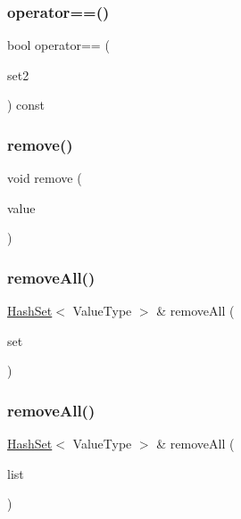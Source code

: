 \subsubsection{\texorpdfstring{operator==()}{operator==()}}
{\footnotesize\ttfamily bool operator== (\begin{DoxyParamCaption}\item[{const \mbox{\hyperlink{classHashSet}{Hash\+Set}}$<$ Value\+Type $>$ \&}]{set2 }\end{DoxyParamCaption}) const}

\mbox{\label{classHashSet_ab8213d15b557acafdd461c231e9ade3b}} 
\subsubsection{\texorpdfstring{remove()}{remove()}}
{\footnotesize\ttfamily void remove (\begin{DoxyParamCaption}\item[{const Value\+Type \&}]{value }\end{DoxyParamCaption})}

\mbox{\label{classHashSet_a43bfd4637e7359634f7b3b57ca6379a3}} 
\subsubsection{\texorpdfstring{remove\+All()}{removeAll()}\hspace{0.1cm}{\footnotesize\ttfamily [1/2]}}
{\footnotesize\ttfamily \mbox{\hyperlink{classHashSet}{Hash\+Set}}$<$ Value\+Type $>$ \& remove\+All (\begin{DoxyParamCaption}\item[{const \mbox{\hyperlink{classHashSet}{Hash\+Set}}$<$ Value\+Type $>$ \&}]{set }\end{DoxyParamCaption})}

\mbox{\label{classHashSet_ae4e6fba96cbdc7cc417dea499fa89e91}} 
\subsubsection{\texorpdfstring{remove\+All()}{removeAll()}\hspace{0.1cm}{\footnotesize\ttfamily [2/2]}}
{\footnotesize\ttfamily \mbox{\hyperlink{classHashSet}{Hash\+Set}}$<$ Value\+Type $>$ \& remove\+All (\begin{DoxyParamCaption}\item[{std\+::initializer\+\_\+list$<$ Value\+Type $>$}]{list }\end{DoxyParamCaption})}

